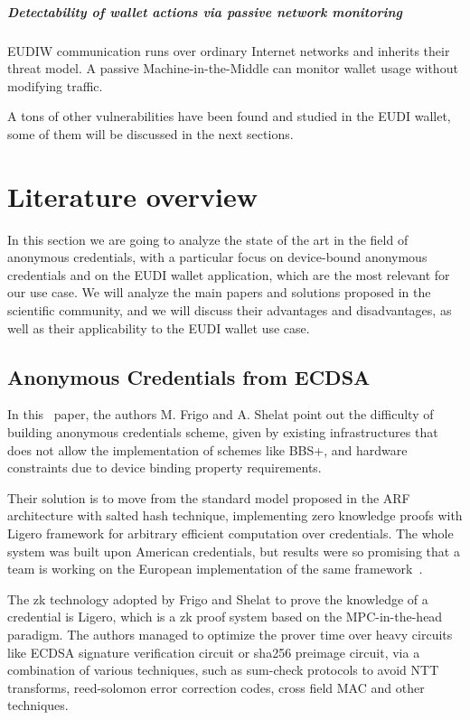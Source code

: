 \documentclass[binding=0.6cm,oneside,noexaminfo]{sapthesis}
\begin{document}
\paragraph{Detectability of wallet actions via passive network monitoring}
EUDIW communication runs over ordinary Internet networks and inherits their
threat model. A passive Machine-in-the-Middle can monitor wallet usage
without modifying traffic.\newline

A tons of other vulnerabilities have been found and studied in the
EUDI wallet, some of them will be discussed in the next sections.

\chapter{Literature overview}
\label{stateoftheart}
In this section we are going to analyze the state of the art in the field of anonymous credentials,
with a particular focus on device-bound anonymous credentials and on the EUDI wallet application,
which are the most relevant for our use case. We will analyze the main papers and solutions proposed 
in the scientific community, and we will discuss their advantages and disadvantages, as well as their 
applicability to the EUDI wallet use case.

\section{Anonymous Credentials from ECDSA}
\label{ecdsaanonymouscredentials}
In this~\cite{cryptoeprint:2024/2010} paper, the authors M. Frigo and A. Shelat point out the difficulty
of building anonymous credentials scheme, given by existing infrastructures that does not allow the 
implementation of schemes like BBS+, and hardware constraints due to device binding property requirements.

Their solution is to move from the standard model proposed in the ARF architecture with salted hash technique,
implementing zero knowledge proofs with Ligero framework for arbitrary efficient computation over credentials.
The whole system was built upon American credentials, but results were so promising that a team
is working on the European implementation of the same framework~\cite{longfellow-eu}.

The zk technology adopted by Frigo and Shelat to prove the knowledge of a credential is Ligero, which is 
a zk proof system based on the MPC-in-the-head paradigm. The authors managed to optimize the prover time
over heavy circuits like ECDSA signature verification circuit or sha256 preimage circuit, via a combination
of various techniques, such as sum-check protocols to avoid NTT transforms, reed-solomon error correction 
codes, cross field MAC and other techniques.
\end{document}
